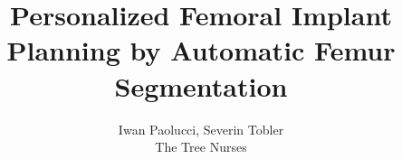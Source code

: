 \documentclass[journal]{IEEEtran}
\title{Personalized Femoral Implant Planning by Automatic Femur Segmentation}
\author{Iwan Paolucci, Severin Tobler\\The Tree Nurses}
\begin{document}
\maketitle

\begin{abstract}

\end{abstract}










\end{document}
